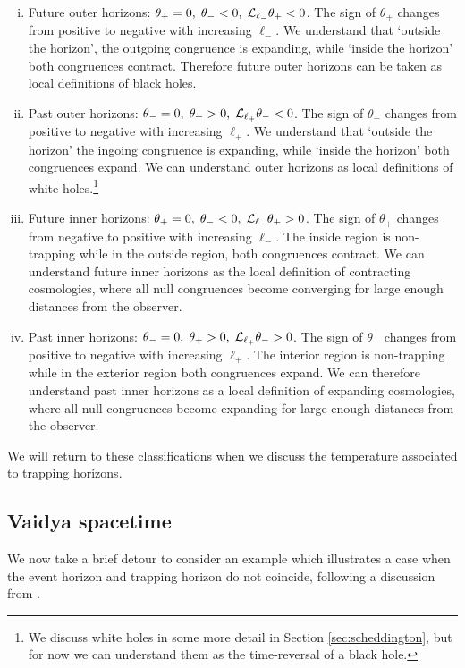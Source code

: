 \begin{enumerate}[(i)]
\item
Future outer horizons: $\theta_+ =0, \; \theta_- <0, \; {\cal L}_{\ell_-}\theta_+ <0$. The sign of $\theta_+$ changes from positive to negative with increasing $\ell_-$. We understand that `outside the horizon', the outgoing congruence is expanding, while `inside the horizon' both congruences contract. Therefore future outer horizons can be taken as local definitions of black holes. 
\item
Past outer horizons: $\theta_-=0, \; \theta_+ >0, \; {\cal L}_{\ell_+} \theta_-<0$. The sign of $\theta_-$ changes from positive to negative with increasing $\ell_+$. We understand that `outside the horizon' the ingoing congruence is expanding, while `inside the horizon' both congruences expand. We can understand outer horizons as local definitions of white holes.\footnote{We discuss white holes in some more detail in Section \ref{sec:scheddington}, but for now we can understand them as the time-reversal of a black hole.} 
\item
Future inner horizons: $\theta_+= 0, \; \theta_-<0, \; {\cal L}_{\ell_-}\theta_+ >0$. The sign of $\theta_+$ changes from negative to positive with increasing $\ell_-$. The inside region is non-trapping while in the outside region, both congruences contract. We can understand future inner horizons as the local definition of contracting cosmologies, where all null congruences become converging for large enough distances from the observer.
\item
Past inner horizons: $\theta_-=0, \; \theta_+ >0, \; {\cal L}_{\ell_+} \theta_->0$. The sign of $\theta_-$ changes from positive to negative with increasing $\ell_+$. The interior region is non-trapping while in the exterior region both congruences expand. We can therefore understand past inner horizons as a local definition of expanding cosmologies, where all null congruences become expanding for large enough distances from the observer. 
\end{enumerate}
We will return to these classifications when we discuss the temperature associated to trapping horizons.

\subsection{Vaidya spacetime}

We now take a brief detour to consider an example which illustrates a case when the event horizon and trapping horizon do not coincide, following a discussion from \cite{Poisson:2009pwt}. 

